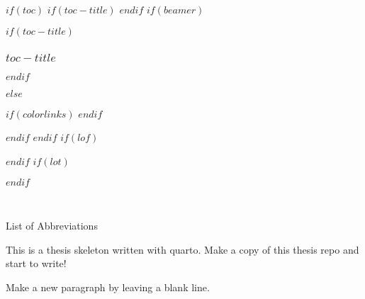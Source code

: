 $if(toc)$
$if(toc-title)$
\renewcommand*\contentsname{$toc-title$}
$endif$
$if(beamer)$
\begin{frame}[allowframebreaks]
$if(toc-title)$
  \frametitle{$toc-title$}
$endif$
  \tableofcontents[hideallsubsections]
\end{frame}
$else$
{
$if(colorlinks)$
\hypersetup{linkcolor=$if(toccolor)$$toccolor$$else$$endif$}
$endif$
\setcounter{tocdepth}{$toc-depth$}
\tableofcontents
}
$endif$
$endif$
$if(lof)$
\listoffigures
{}
$endif$
$if(lot)$
\listoftables
{}
$endif$

\clearpage
\newpage
\thispagestyle{empty} %
\mbox{~}
\clearpage
\newpage

\thispagestyle{plain} %

\begin{center}
\Large{List of Abbreviations}
\end{center}

\vspace*{\baselineskip}

This is a thesis skeleton written with quarto.
Make a copy of this thesis repo and start to write!

Make a new paragraph by leaving a blank line.

\clearpage
\newpage
\thispagestyle{empty} %
\mbox{~}
\clearpage
\newpage


